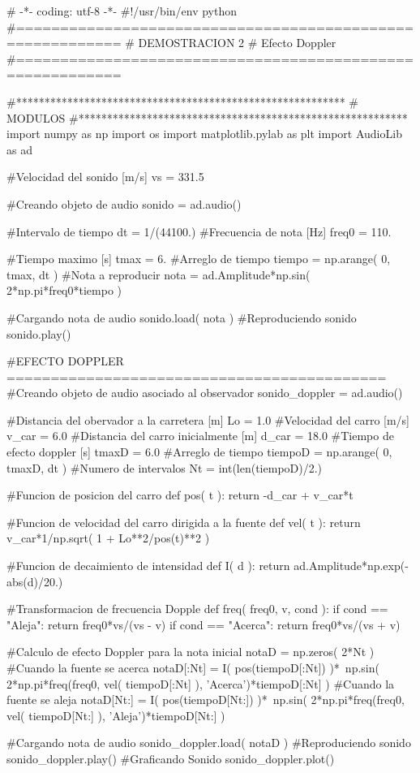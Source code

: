 \begin{listing}[style=python]
# -*- coding: utf-8 -*-
#!/usr/bin/env python
#==========================================================
# DEMOSTRACION 2
# Efecto Doppler
#==========================================================

#**********************************************************
#	MODULOS
#**********************************************************
import numpy as np
import os
import matplotlib.pylab as plt
import AudioLib as ad

#Velocidad del sonido [m/s]
vs = 331.5

#Creando objeto de audio
sonido = ad.audio()

#Intervalo de tiempo
dt = 1/(44100.)
#Frecuencia de nota [Hz]
freq0 = 110.

#Tiempo maximo	[s]
tmax = 6.
#Arreglo de tiempo
tiempo = np.arange( 0, tmax, dt )
#Nota a reproducir
nota = ad.Amplitude*np.sin( 2*np.pi*freq0*tiempo )

#Cargando nota de audio
sonido.load( nota )
#Reproduciendo sonido
sonido.play()

#EFECTO DOPPLER ===========================================
#Creando objeto de audio asociado al observador
sonido_doppler = ad.audio()

#Distancia del obervador a la carretera [m]
Lo = 1.0
#Velocidad del carro [m/s]
v_car = 6.0
#Distancia del carro inicialmente [m]
d_car = 18.0
#Tiempo de efecto doppler [s]
tmaxD = 6.0
#Arreglo de tiempo
tiempoD = np.arange( 0, tmaxD, dt )
#Numero de intervalos
Nt = int(len(tiempoD)/2.)

#Funcion de posicion del carro
def pos( t ):
    return -d_car + v_car*t
    
#Funcion de velocidad del carro dirigida a la fuente
def vel( t ):
    return v_car*1/np.sqrt( 1 + Lo**2/pos(t)**2 )
    
#Funcion de decaimiento de intensidad
def I( d ):
    return ad.Amplitude*np.exp(-abs(d)/20.)
    
#Transformacion de frecuencia Dopple
def freq( freq0, v, cond ):
    if cond == "Aleja":
	return freq0*vs/(vs - v)
    if cond == "Acerca":
	return freq0*vs/(vs + v)

#Calculo de efecto Doppler para la nota inicial
notaD = np.zeros( 2*Nt )
#Cuando la fuente se acerca
notaD[:Nt] = I( pos(tiempoD[:Nt]) )*\
np.sin( 2*np.pi*freq(freq0, vel( tiempoD[:Nt] ), 'Acerca')*tiempoD[:Nt] )
#Cuando la fuente se aleja
notaD[Nt:] = I( pos(tiempoD[Nt:]) )*\
np.sin( 2*np.pi*freq(freq0, vel( tiempoD[Nt:] ), 'Aleja')*tiempoD[Nt:] )

#Cargando nota de audio
sonido_doppler.load( notaD )
#Reproduciendo sonido
sonido_doppler.play()
#Graficando Sonido
sonido_doppler.plot()
\end{listing}

